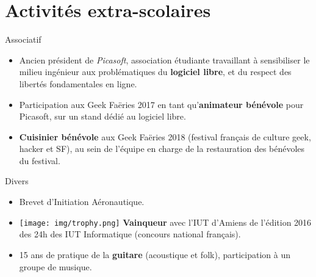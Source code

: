 \documentclass[a4paper]{twentysecondcv} %
\begin{document}
\section{Activités extra-scolaires}
\begin{twenty}
    \twentyitem
    	{}
		{}
        {Associatif}
        {}
        {}
        {\begin{itemize}
        \item Ancien président de \textit{Picasoft}, association étudiante travaillant à sensibiliser le milieu ingénieur aux problématiques du \textbf{logiciel libre}, et du respect des libertés fondamentales en ligne.
        \item Participation aux Geek Faëries 2017 en tant qu'\textbf{animateur bénévole} pour Picasoft, sur un stand dédié au logiciel libre.
        \item \textbf{Cuisinier bénévole} aux Geek Faëries 2018 (festival français de culture geek, hacker et SF), au sein de l'équipe en charge de la restauration des bénévoles du festival.
        \end{itemize}}
    \twentyitem
        {}
                {}
        {Divers}
        {}
        {}
        {\begin{itemize}
        \item Brevet d'Initiation Aéronautique.
        \item \texttt{[image: img/trophy.png]} \textbf{Vainqueur} avec l'IUT d'Amiens de l'édition 2016 des 24h des IUT Informatique (concours national français).
        \item 15 ans de pratique de la \textbf{guitare} (acoustique et folk), participation à un groupe de musique.
        \end{itemize}}
\end{twenty}
\end{document}
